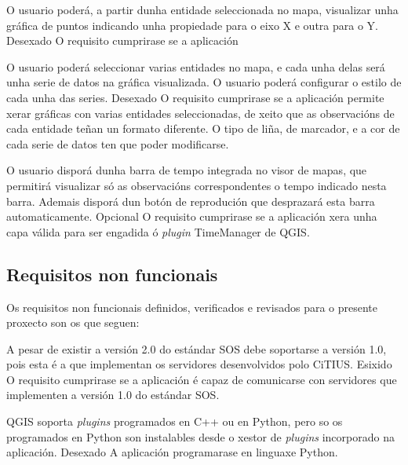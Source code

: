 		  	{O usuario poderá, a partir dunha entidade seleccionada no mapa, visualizar unha gráfica de puntos indicando unha propiedade para o eixo X e outra para o Y.}%
			{Desexado}%
			{O requisito cumprirase se a aplicación}%
			
		  	{O usuario poderá seleccionar varias entidades no mapa, e cada unha delas será unha serie de datos na gráfica visualizada. O usuario poderá configurar o estilo de cada unha das series.}%
			{Desexado}%
			{O requisito cumprirase se a aplicación permite xerar gráficas con varias entidades seleccionadas, de xeito que as observacións de cada entidade teñan un formato diferente. O tipo de liña, de marcador, e a cor de cada serie de datos ten que poder modificarse.}%
			
		  	{O usuario disporá dunha barra de tempo integrada no visor de mapas, que permitirá visualizar só as observacións correspondentes o tempo indicado nesta barra. Ademais disporá dun botón de reprodución que desprazará esta barra automaticamente.}%
			{Opcional}%
			{O requisito cumprirase se a aplicación xera unha capa válida para ser engadida ó \emph{plugin} TimeManager de QGIS.}%

\subsection{Requisitos non funcionais}
Os requisitos non funcionais definidos, verificados e revisados para o presente proxecto son os que seguen:

		  	{A pesar de existir a versión 2.0 do estándar SOS debe soportarse a versión 1.0, pois esta é a que implementan os servidores desenvolvidos polo CiTIUS.}%
			{Esixido}%
			{O requisito cumprirase se a aplicación é capaz de comunicarse con servidores que implementen a versión 1.0 do estándar SOS.}%
			
		  	{QGIS soporta \emph{plugins} programados en C++ ou en Python, pero so os programados en Python son instalables desde o xestor de \emph{plugins} incorporado na aplicación.}%
			{Desexado}%
			{A aplicación programarase en linguaxe Python.}%
			
